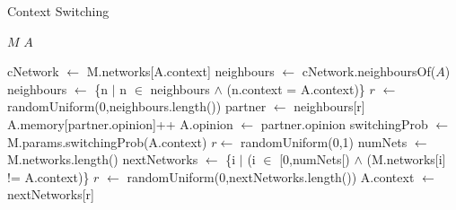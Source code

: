 \documentclass{article}
\begin{document}
 
  \begin{algorithm}
  \caption{Context Switching}
  \label{model:context_switching}
  \begin{algorithmic}
  \vspace{0.5em}
  \STATE $M$ 
  \STATE $A$ 
  \\ \hrulefill 
  
  \STATE{}
  \STATE cNetwork $\leftarrow$ M.networks[A.context]
  \STATE 
  \STATE {}
  \STATE neighbours $\leftarrow$ cNetwork.neighboursOf($A$) 
  \STATE {}
  \STATE neighbours $\leftarrow$ \{n $|$ n $\in$ neighbours $\wedge$ (n.context = A.context)\}
  \STATE
   \STATE{} 
  \STATE $r$ $\leftarrow$ randomUniform(0,neighbours.length())
  \STATE partner $\leftarrow$ neighbours[r]
  \STATE
  \STATE {}
   \STATE {}
  \STATE A.memory[partner.opinion]++
  \STATE A.opinion $\leftarrow$ partner.opinion
  \ENDIF
  \STATE
  \STATE {}
  \STATE switchingProb $\leftarrow$ M.params.switchingProb(A.context)
  \STATE $r \leftarrow $ randomUniform(0,1)
  \STATE numNets $\leftarrow$ M.networks.length()
  \STATE nextNetworks $\leftarrow$ \{i $|$ (i $\in$ [0,numNets[) $\wedge$ (M.networks[i] != A.context)\}
  \STATE $r$ $\leftarrow$ randomUniform(0,nextNetworks.length())
  \STATE A.context $\leftarrow$ nextNetworks[r]
  \ENDIF
  \end{algorithmic}
  \end{algorithm}
  
\end{document}
